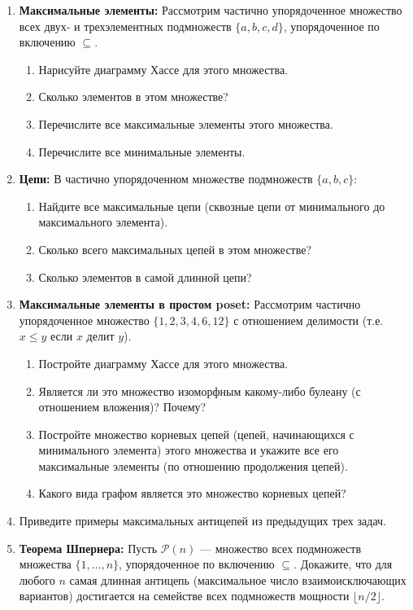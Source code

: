\documentclass[11pt, a4paper]{extarticle}
\newcommand{\Pcal}{{\mathcal P}}
\renewcommand{\le}{\leqslant}
\begin{document}
\begin{exercise}\; 
\begin{enumerate}
    \item \textbf{Максимальные элементы:} Рассмотрим частично упорядоченное множество всех двух- и трехэлементных подмножеств $\{a, b, c, d\}$, упорядоченное по включению $\subseteq$.
    \begin{enumerate}
        \item Нарисуйте диаграмму Хассе для этого множества.
        \item Сколько элементов в этом множестве?
        \item Перечислите все максимальные элементы этого множества.
        \item Перечислите все минимальные элементы.
    \end{enumerate}
    
    \item \textbf{Цепи:} В частично упорядоченном множестве подмножеств $\{a, b, c\}$:
    \begin{enumerate}
        \item Найдите все максимальные цепи (сквозные цепи от минимального до максимального элемента).
        \item Сколько всего максимальных цепей в этом множестве?
        \item Сколько элементов в самой длинной цепи?
    \end{enumerate}
    
    \item \textbf{Максимальные элементы в простом poset:} Рассмотрим частично упорядоченное множество $\{1, 2, 3, 4, 6, 12\}$ с отношением делимости (т.е. $x \le y$ если $x$ делит $y$).
    \begin{enumerate}
        \item Постройте диаграмму Хассе для этого множества.
        \item Является ли это множество изоморфным какому-либо булеану (с отношением вложения)? Почему?
        \item Постройте множество корневых цепей (цепей, начинающихся с минимального элемента) этого множества и укажите все его максимальные элементы (по отношению продолжения цепей).
        \item Какого вида графом является это множество корневых цепей?
    \end{enumerate}
    \item Приведите примеры максимальных антицепей из предыдущих трех задач.
    \item \textbf{Теорема Шпернера:}
        Пусть $\Pcal(n)$ — множество всех подмножеств множества $\{1, \dots, n\}$, упорядоченное по включению $\subseteq$.
        Докажите, что для любого $n$ самая длинная антицепь (максимальное число взаимоисключающих вариантов) достигается на семействе всех подмножеств мощности $\lfloor n/2 \rfloor$.
   

\end{enumerate}
\end{exercise}
\end{document}
